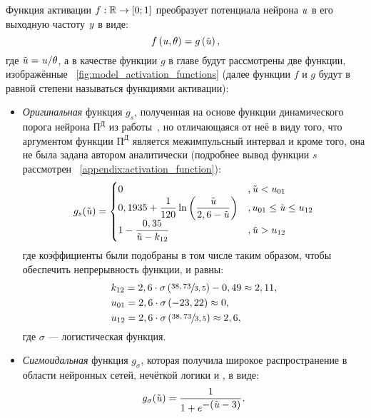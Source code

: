 Функция активации $f: \mathbb{R} \to \left[0;1\right]$ преобразует потенциала нейрона $\mathit{u}$ в его выходную частоту $\mathit{y}$ в виде:
\begin{equation}
    f\left( \mathit{u}, \theta \right) = g\left( \tilde{\mathit{u}} \right), 
\end{equation}
где $\tilde{\mathit{u}} = \mathit{u} / \theta$, а в качестве функции $g$ в главе будут рассмотрены две функции, изображённые \onfigure~\ref{fig:model_activation_functions} (далее функции $f$ и $g$ будут в равной степени называться функциями активации):
\begin{itemize}
	\item \textit{Оригинальная} функция $g_{s}$, полученная на основе функции динамического порога нейрона $\text{П}^\text{Д}$ из работы~\cite{EmelyanovYaroslavsky1990}, но отличающаяся от неё в виду того, что аргументом функции  $\text{П}^\text{Д}$ является межимпульсный интервал и кроме того, она не была задана автором аналитически (подробнее вывод функции $s$ рассмотрен \inappendix~\ref{appendix:activation_function}):
		\begin{equation}
            g_{s}(\tilde{\mathit{u}}) = 
            \begin{cases}
                0                                                                                               &, \tilde{\mathit{u}} < u_{01} \\
                0,1935 + \dfrac{1}{120} \ln\left( \dfrac{\tilde{\mathit{u}}}{2,6 - \tilde{\mathit{u}}} \right)  &, u_{01} \le \tilde{\mathit{u}} \le u_{12} \\
                1 - \dfrac{0,35}{\tilde{\mathit{u}} - k_{12}}                                                   &, \tilde{\mathit{u}} > u_{12} \\
            \end{cases}
		\end{equation}
        где коэффициенты были подобраны в том числе таким образом, чтобы обеспечить непрерывность функции, и равны: 
        \begin{align*}
            &k_{12} = 2,6 \cdot \sigma\left(\sfrac{38,73}{3,5}\right) - 0,49 \approx 2,11, \\
            &u_{01} = 2,6\cdot\sigma\left(-23,22\right) \approx 0, \\
            &u_{12} = 2,6 \cdot \sigma\left(\sfrac{38,73}{3,5}\right) \approx 2,6,
        \end{align*}
        где $\sigma$ --- логистическая функция.
	\item \textit{Сигмоидальная} функция $g_{\sigma}$, которая получила широкое распространение в области нейронных сетей, нечёткой логики и \other, в виде:
		\begin{equation}
			g_{\sigma}(\tilde{\mathit{u}}) = \dfrac{1}{1 + e^{\displaystyle -(\tilde{\mathit{u}} - 3)}}.
		\end{equation}
\end{itemize}

